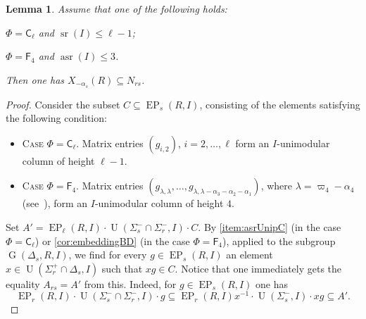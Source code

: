 \documentclass[oneside, 12pt]{amsart}
\theoremstyle{plain}
\numberwithin{equation}{section}
\newtheorem{lemma}{Lemma}
\numberwithin{lemma}{section}
\theoremstyle{definition}
\theoremstyle{remark}
\DeclareMathOperator{\G}{G}
\DeclareMathOperator{\EP}{EP}
\DeclareMathOperator{\U}{U}
\DeclareMathOperator{\sr}{sr}
\DeclareMathOperator{\asr}{asr}
\newcommand{\rC}{\mathsf{C}}
\newcommand{\rF}{\mathsf{F}}
\begin{document}
\begin{lemma}\label{lemma:DVST}
Assume that one of the following holds:
\begin{lemlist}
 \item \label{lemma:DVcaseCl} $\Phi=\rC_\ell$ and $\sr(I) \leq \ell-1$;
 \item \label{lemma:DVcaseF4} $\Phi=\rF_4$ and $\asr(I) \leq 3$.
\end{lemlist}
Then one has $X_{-\alpha_s}(R) \subseteq N_{rs}$.
\end{lemma}
\begin{proof}
Consider the subset $C \subseteq \EP_s(R, I)$, consisting of the elements satisfying the following condition:
\begin{itemize}
 \item \textsc{Case $\Phi=\rC_\ell$.} Matrix entries $(g_{i, 2})$, $i=2, \ldots, \ell$ form an $I$-unimodular column of height $\ell-1$.
 \item \textsc{Case $\Phi=\rF_4$.} Matrix entries $(g_{\lambda, \lambda}, \ldots, g_{\lambda, \lambda - \alpha_3 - \alpha_2 - \alpha_1})$, where $\lambda = \varpi_4 - \alpha_4$ (see~\cite[Fig.~26]{PSV98}), 
                                     form an $I$-unimodular column of height $4$. \end{itemize}

Set $A' = \EP_\ell(R, I) \cdot \U(\Sigma_s^- \cap \Sigma_r^-, I) \cdot C$.
By \cref{item:asrUnipC} (in the case $\Phi=\rC_\ell$) or \cref{cor:embeddingBD} (in the case $\Phi=\rF_4$), applied to the subgroup $\G(\Delta_s, R, I)$,
we find for every $g \in \EP_s(R, I)$ an element $x \in \U(\Sigma_r^+ \cap \Delta_s, I)$ such that $xg \in C$.  
Notice that one immediately gets the equality $A_{rs} = A'$ from this.
Indeed, for $g\in \EP_s(R, I)$ one has
\begin{equation*} \EP_r(R, I) \cdot \U(\Sigma_s^- \cap \Sigma_r^-, I) \cdot g \subseteq 
 \EP_r(R, I)x^{-1}  \cdot \U(\Sigma_s^-, I) \cdot xg \subseteq A'. \end{equation*}


\end{proof}
\end{document}
